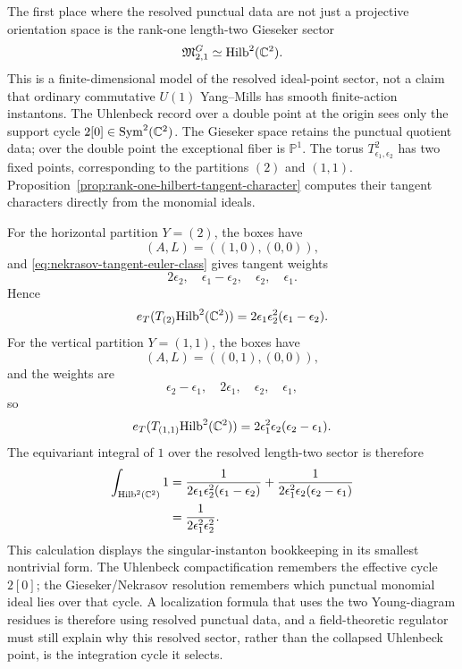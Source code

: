 \begin{example}
\label{ex:k-two-hilbert-scheme-fixed-points}
The first place where the resolved punctual data are not just a projective
orientation space is the rank-one length-two Gieseker sector
\[
  \mathfrak M_{2,1}^{G}\simeq {\rm Hilb}^{2}(\mathbb C^2).
\]
This is a finite-dimensional model of the resolved ideal-point sector, not a
claim that ordinary commutative \(U(1)\) Yang--Mills has smooth finite-action
instantons.  The Uhlenbeck record over a double point at the origin sees only
the support cycle \(2[0]\in{\rm Sym}^{2}(\mathbb C^2)\).  The Gieseker space
retains the punctual quotient data; over the double point the exceptional
fiber is \(\mathbb P^1\).  The torus \(T^2_{\epsilon_1,\epsilon_2}\) has two
fixed points, corresponding to the partitions \((2)\) and \((1,1)\).
Proposition~\ref{prop:rank-one-hilbert-tangent-character} computes their
tangent characters directly from the monomial ideals.

For the horizontal partition \(Y=(2)\), the boxes have
\[
  (A,L)=((1,0),(0,0)),
\]
and \eqref{eq:nekrasov-tangent-euler-class} gives tangent weights
\[
  2\epsilon_2,\quad \epsilon_1-\epsilon_2,\quad
  \epsilon_2,\quad \epsilon_1 .
\]
Hence
\[
  e_T(T_{(2)}{\rm Hilb}^{2}(\mathbb C^2))
  =
  2\epsilon_1\epsilon_2^2(\epsilon_1-\epsilon_2).
\]
For the vertical partition \(Y=(1,1)\), the boxes have
\[
  (A,L)=((0,1),(0,0)),
\]
and the weights are
\[
  \epsilon_2-\epsilon_1,\quad 2\epsilon_1,\quad
  \epsilon_2,\quad \epsilon_1 ,
\]
so
\[
  e_T(T_{(1,1)}{\rm Hilb}^{2}(\mathbb C^2))
  =
  2\epsilon_1^2\epsilon_2(\epsilon_2-\epsilon_1).
\]
The equivariant integral of \(1\) over the resolved length-two sector is
therefore
\begin{equation}
\begin{aligned}
  \int_{{\rm Hilb}^{2}(\mathbb C^2)}1
  &=
  \frac{1}{2\epsilon_1\epsilon_2^2(\epsilon_1-\epsilon_2)}
  +
  \frac{1}{2\epsilon_1^2\epsilon_2(\epsilon_2-\epsilon_1)}
\\
  &=
  \frac{1}{2\epsilon_1^2\epsilon_2^2}.
  \label{eq:hilb-two-equivariant-integral}
\end{aligned}
\end{equation}
This calculation displays the singular-instanton bookkeeping in its smallest
nontrivial form.  The Uhlenbeck compactification remembers the effective
cycle \(2[0]\); the Gieseker/Nekrasov resolution remembers which punctual
monomial ideal lies over that cycle.  A localization formula that uses the
two Young-diagram residues is therefore using resolved punctual data, and a
field-theoretic regulator must still explain why this resolved sector, rather
than the collapsed Uhlenbeck point, is the integration cycle it selects.
\end{example}

